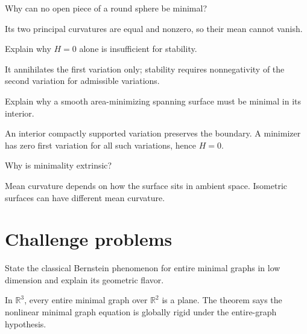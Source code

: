 \begin{problem}\label{prob:vii19-09}
Why can no open piece of a round sphere be minimal?
\end{problem}
\begin{solution}
Its two principal curvatures are equal and nonzero, so their mean cannot vanish.
\end{solution}

\begin{problem}\label{prob:vii19-10}
Explain why \(H=0\) alone is insufficient for stability.
\end{problem}
\begin{solution}
It annihilates the first variation only; stability requires nonnegativity of the second variation for admissible variations.
\end{solution}

\begin{problem}\label{prob:vii19-11}
Explain why a smooth area-minimizing spanning surface must be minimal in its interior.
\end{problem}
\begin{solution}
An interior compactly supported variation preserves the boundary. A minimizer has zero first variation for all such variations, hence \(H=0\).
\end{solution}

\begin{problem}\label{prob:vii19-12}
Why is minimality extrinsic?
\end{problem}
\begin{solution}
Mean curvature depends on how the surface sits in ambient space. Isometric surfaces can have different mean curvature.
\end{solution}

\section{Challenge problems}

\begin{problem}\label{prob:vii19-ch01}
State the classical Bernstein phenomenon for entire minimal graphs in low dimension and explain its geometric flavor.
\end{problem}
\begin{solution}
In \(\mathbb R^3\), every entire minimal graph over \(\mathbb R^2\) is a plane. The theorem says the nonlinear minimal graph equation is globally rigid under the entire-graph hypothesis.
\end{solution}

